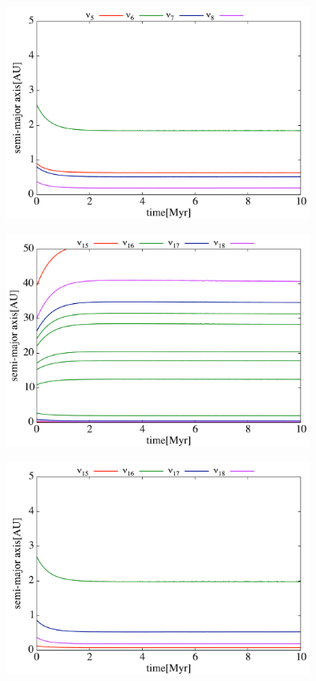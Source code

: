 \documentclass[11pt,a4paper,oneside,onecolumn]{jarticle}
\begin{document}
\begin{figure}[H]
\centering
\includegraphics[width=10cm]{./image/SecularResonanceAxis_ecc_upto5AU.pdf}
\caption{\label{}}
\end{figure}

\begin{figure}[H]
\centering
\includegraphics[width=10cm]{./image/SecularResonanceAxis_inc.pdf}
\caption{\label{}}
\end{figure}

\begin{figure}[H]
\centering
\includegraphics[width=10cm]{./image/SecularResonanceAxis_inc_upto5AU.pdf}
\caption{\label{}}
\end{figure}
\end{document}
